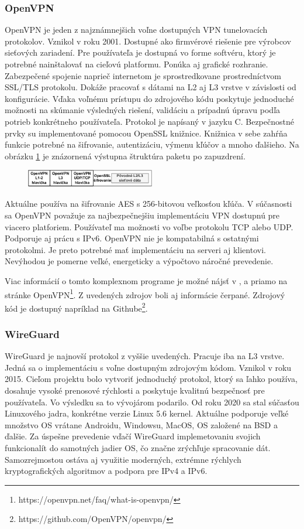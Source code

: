 \subsubsection{OpenVPN}
OpenVPN je jeden z najznámnejšich voľne dostupných VPN tunelovacích protokolov. Vznikol v roku 2001. Dostupné ako firmvérové riešenie pre výrobcov sieťových zariadení. Pre používateľa je dostupná vo forme softvéru, ktorý je potrebné nainštalovať na cieľovú platformu. Ponúka aj grafické rozhranie. Zabezpečené spojenie naprieč internetom je sprostredkovane prostredníctvom SSL/TLS protokolu. Dokáže pracovať s dátami na L2 aj L3 vrstve v závislosti od konfigurácie. Vďaka voľnému prístupu do zdrojového kódu poskytuje jednoduché možnosti na skúmanie výsledných riešení, validáciu a prípadnú úpravu podľa potrieb konkrétneho používateľa. Protokol je napísaný v jazyku C. Bezpečnostné prvky su implementované pomocou OpenSSL knižnice. Knižnica v sebe zahŕňa funkcie potrebné na šifrovanie, autentizáciu, výmenu kľúčov a mnoho ďalšieho. Na obrázku \ref{ovpnptstrc} je znázornená výstupna štruktúra paketu po zapuzdrení. 
\begin{figure}[!h]
	\centering
	\includegraphics[width=0.5\textwidth]{figures/ovpnptstrc}
	\caption{}
	\label{ovpnptstrc}
\end{figure}

Aktuálne používa na šifrovanie AES s 256-bitovou veľkosťou kľúča. V súčasnosti sa OpenVPN považuje za najbezpečnejšiu implementáciu VPN dostupnú pre viacero platforiem. Používateľ ma možnosti vo voľbe protokolu TCP alebo UDP. Podporuje aj prácu s IPv6. OpenVPN nie je kompatabilná s ostatnými protokolmi. Je preto potrebné mať implementáciu na serveri aj klientovi. Nevýhodou je pomerne veľké, energeticky a výpočtovo náročné prevedenie.

Viac informácií o tomto komplexnom programe je možné nájsť v \cite{vpntech}, \cite{ovpn} a priamo na stránke OpenVPN\footnote{https://openvpn.net/faq/what-is-openvpn/}. Z uvedených zdrojov boli aj informácie čerpané. Zdrojový kód je dostupný napríklad na Githube\footnote{https://github.com/OpenVPN/openvpn/}. 
\subsubsection{WireGuard}
WireGuard je najnovší protokol z vyššie uvedených. Pracuje iba na L3 vrstve. Jedná sa o implementáciu s voľne dostupným zdrojovým kódom. Vznikol v roku 2015. Cieľom projektu bolo vytvoriť jednoduchý protokol, ktorý sa ľahko používa, dosahuje vysoké prenosové rýchlosti a poskytuje kvalitnú bezpečnosť pre používateľa. Vo výsledku sa to vývojárom podarilo. Od roku 2020 sa stal súčasťou Linuxového jadra, konkrétne verzie Linux 5.6 kernel. Aktuálne podporuje veľké množstvo OS vrátane Androidu, Windowsu, MacOS, OS založené na BSD \cite{bsd} a ďalšie. Za úspešne prevedenie vďačí WireGuard implemetovaniu svojich funkcionalít do samotných jadier OS, čo značne zrýchľuje spracovanie dát. Samozrejmostou ostáva aj využitie moderných, extrémne rýchlych kryptografických algoritmov a podpora pre IPv4 a IPv6. 


